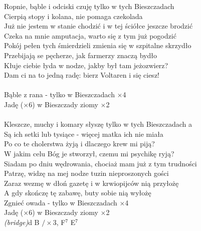 \documentclass[a5paper, 10pt]{book}
\begin{document}
\begin{minipage}[t]{1\textwidth}
  Ropnie, bąble i odciski czuję tylko w tych Bieszczadach\\
  Cierpią stopy i kolana, nie pomaga czekolada\\
  Już nie jestem w stanie chodzić i w tej ściółce jeszcze brodzić\\
  Czeka na mnie amputacja, warto się z tym już pogodzić\\
  \hspace*{3mm}Pokój pełen tych śmierdzieli zmienia się w szpitalne skrzydło\\
  \hspace*{3mm}Przebijają se pęcherze, jak farmerzy znaczą bydło\\
  \hspace*{3mm}Kłuje ciebie łyda w nodze, jakby był tam jeżozwierz?\\
  \hspace*{3mm}Dam ci na to jedną radę: bierz Voltaren i się ciesz!\\
  \\
  \hspace*{10mm}Bąble z rana - tylko w Bieszczadach $\times$4\\
  \hspace*{10mm}Jadę ($\times$6) w Bieszczady ziomy $\times$2\\
  \\
  Kleszcze, muchy i komary słyszę tylko w tych Bieszczadach a\\
  Są ich setki lub tysiące - więcej matka ich nie miała\\
  Po co te cholerstwa żyją i dlaczego krew mi piją?\\
  W jakim celu Bóg je stworzył, czemu mi psychikę ryją?\\
  \hspace*{3mm}Siadam po dniu wędrowania, chociaż mam już z tym trudności\\
  \hspace*{3mm}Patrzę, widzę na mej nodze tuzin nieproszonych gości\\
  \hspace*{3mm}Zaraz wezmę w dłoń gazetę i w krwiopijców nią przyłożę\\
  \hspace*{3mm}A gdy skończę tę zabawę, buty sobie nią wyłożę\\

  \hspace*{10mm}Zgnieć owada - tylko w Bieszczadach $\times$4\\
  \hspace*{10mm}Jadę ($\times$6) w Bieszczady ziomy $\times$2\\

  \textit{(bridge)}\hfill d B $/ \times$3,
  F$^7$ E$^7$\\
\end{minipage}
\end{document}
